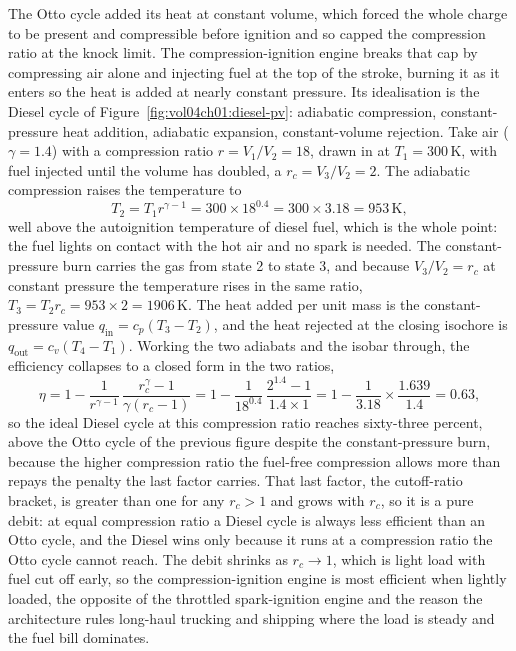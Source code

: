 The Otto cycle added its heat at constant volume, which forced the whole charge
to be present and compressible before ignition and so capped the compression
ratio at the knock limit. The compression-ignition engine breaks that cap by
compressing air alone and injecting fuel at the top of the stroke, burning it as
it enters so the heat is added at nearly constant pressure. Its idealisation is
the Diesel cycle of Figure~\ref{fig:vol04ch01:diesel-pv}: adiabatic compression,
constant-pressure heat addition, adiabatic expansion, constant-volume rejection.
Take air ($\gamma = 1.4$) with a compression ratio $r = V_1/V_2 = 18$, drawn in
at $T_1 = 300\,\si{\kelvin}$, with fuel injected until the volume has doubled, a
 $r_c = V_3/V_2 = 2$. The adiabatic compression raises the
temperature to
\[
T_2 = T_1 r^{\gamma-1} = 300 \times 18^{0.4} = 300 \times 3.18 =
953\,\si{\kelvin},
\]
well above the autoignition temperature of diesel fuel, which is the whole point:
the fuel lights on contact with the hot air and no spark is needed. The
constant-pressure burn carries the gas from state 2 to state 3, and because
$V_3/V_2 = r_c$ at constant pressure the temperature rises in the same ratio,
$T_3 = T_2 r_c = 953 \times 2 = 1906\,\si{\kelvin}$. The heat added per unit mass
is the constant-pressure value $q_{\text{in}} = c_p(T_3 - T_2)$, and the heat
rejected at the closing isochore is $q_{\text{out}} = c_v(T_4 - T_1)$. Working
the two adiabats and the isobar through, the efficiency collapses to a closed
form in the two ratios,
\[
\eta = 1 - \frac{1}{r^{\gamma-1}}\,\frac{r_c^{\gamma} - 1}{\gamma(r_c - 1)}
     = 1 - \frac{1}{18^{0.4}}\,\frac{2^{1.4} - 1}{1.4 \times 1}
     = 1 - \frac{1}{3.18}\times \frac{1.639}{1.4} = 0.63,
\]
so the ideal Diesel cycle at this compression ratio reaches sixty-three percent,
above the Otto cycle of the previous figure despite the constant-pressure burn,
because the higher compression ratio the fuel-free compression allows more than
repays the penalty the last factor carries. That last factor, the
cutoff-ratio bracket, is greater than one for any $r_c > 1$ and grows with
$r_c$, so it is a pure debit: at equal compression ratio a Diesel cycle is always
less efficient than an Otto cycle, and the Diesel wins only because it runs at a
compression ratio the Otto cycle cannot reach. The debit shrinks as $r_c \to 1$,
which is light load with fuel cut off early, so the compression-ignition engine
is most efficient when lightly loaded, the opposite of the throttled
spark-ignition engine and the reason the architecture rules long-haul trucking
and shipping where the load is steady and the fuel bill dominates.


